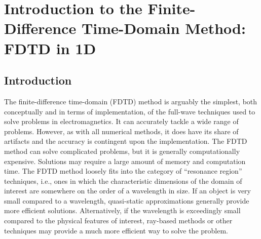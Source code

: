 \chapter[Introduction to the FDTD Method]{Introduction to
the Finite-Difference Time-Domain Method: FDTD in 1D
\label{chap:fdtdIntro}} 


\renewcommand{\thefootnote}{\fnsymbol{footnote}}

\section{Introduction}

The finite-difference time-domain (FDTD) method is arguably the
simplest, both conceptually and in terms of implementation, of the
full-wave techniques used to solve problems in electromagnetics.  It
can accurately tackle a wide range of problems.  However, as with all
numerical methods, it does have its share of artifacts and the
accuracy is contingent upon the implementation.  The FDTD method can
solve complicated problems, but it is generally computationally
expensive.  Solutions may require a large amount of memory and
computation time.  The FDTD method loosely fits into the category of
``resonance region'' techniques, i.e., ones in which the
characteristic dimensions of the domain of interest are somewhere on
the order of a wavelength in size.  If an object is very small
compared to a wavelength, quasi-static approximations generally
provide more efficient solutions.  Alternatively, if the wavelength is
exceedingly small compared to the physical features of interest,
ray-based methods or other techniques may provide a much more
efficient way to solve the problem.

